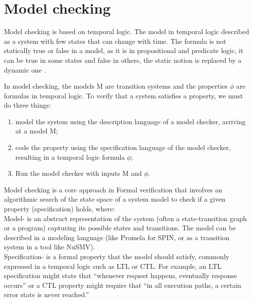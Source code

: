 %
%
%
%
%
%
%


\section{Model checking}

Model checking is based on temporal logic. 
The model in temporal logic described as a system with few states that can change with time.
The formula is not statically true or false in a model, as it is in propositional and predicate logic,
it can be true in some states and false in others, the static notion is replaced 
by a dynamic one \cite{HuthR1}.

In model checking, the models M are transition systems and the properties $\phi$ are formulas in temporal logic. 
To verify that a system satisfies a property, we must do three things:
\begin{enumerate}
    \item model the system using the description language of a model checker, arriving at a model M;
    \item code the property using the specification language of the model checker, resulting in a temporal logic formula $\phi$;
    \item Run the model checker with inputs M and $\phi$.
\end{enumerate}



Model checking is a core approach in Formal verification that involves an algorithmic search of the state space of a system model to check if a
given property (specification) holds, where:\\
Model- is an abstract representation of the system (often a state-transition graph or a
program) capturing its possible states and transitions. The model can be described in a modeling language
(like Promela for SPIN, or as a transition system in a tool like NuSMV). \\
Specification- is a formal property that the model should satisfy, commonly expressed in a temporal logic such as LTL or CTL. For example, an LTL
specification might state that “whenever request happens, eventually response occurs” or a CTL property
might require that “in all execution paths, a certain error state is never reached.” \\ 


